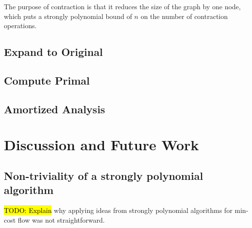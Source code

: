 \documentclass[11pt]{article}
\theoremstyle{definition}
\theoremstyle{definition}
\newcommand{\todo}[1]{\hl{TODO: #1}}
\begin{document}
	The purpose of contraction is that it reduces the size of the graph by one node,
	which puts a strongly polynomial bound of $n$ on the number of contraction
	operations.
	\subsection{Expand to Original}
	\subsection{Compute Primal}
	\subsection{Amortized Analysis}


\section{Discussion and Future Work}

	\subsection{Non-triviality of a strongly polynomial algorithm}

	\todo{Explain} why applying ideas from strongly polynomial algorithms for
	min-cost flow was not straightforward. 



\setlength{\bibitemsep}{0pt}
\nocite{*}
\printbibliography
\end{document}
